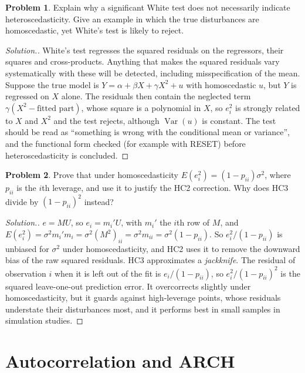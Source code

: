 \documentclass[11pt,a4paper]{article}
\numberwithin{equation}{section}
\DeclareMathOperator{\Var}{Var}
\theoremstyle{definition}
\newtheorem{problemx}{Problem}[subsection]
\newenvironment{problem}{\begin{problemx}}{\end{problemx}}
\newenvironment{solution}
  {\renewcommand{\qedsymbol}{}\begin{proof}[\textit{Solution}.]}
  {\end{proof}}
\begin{document}
\begin{problem}
Explain why a significant White test does not necessarily indicate heteroscedasticity. Give an example in which the true disturbances are homoscedastic,
yet White's test is likely to reject.
\end{problem}

\begin{solution}
White's test regresses the squared residuals on the regressors, their squares and cross-products. Anything that makes the squared residuals vary
systematically with these will be detected, including misspecification of the mean. Suppose the true model is $Y = \alpha + \beta X + \gamma X^2 + u$ with
homoscedastic $u$, but $Y$ is regressed on $X$ alone. The residuals then contain the neglected term $\gamma(X^2 - \text{fitted part})$, whose square is a
polynomial in $X$, so $e_i^2$ is strongly related to $X$ and $X^2$ and the test rejects, although $\Var(u)$ is constant. The test should be read as ``something is
wrong with the conditional mean or variance'', and the functional form checked (for example with RESET) before heteroscedasticity is concluded.
\end{solution}

\begin{problem}
Prove that under homoscedasticity $E(e_i^2) = (1 - p_{ii})\sigma^2$, where $p_{ii}$ is the $i$th leverage, and use it to justify the HC2 correction. Why does HC3 divide by
$(1 - p_{ii})^2$ instead?
\end{problem}

\begin{solution}
$e = MU$, so $e_i = m_i'U$, with $m_i'$ the $i$th row of $M$, and $E(e_i^2) = \sigma^2m_i'm_i = \sigma^2(M^2)_{ii} = \sigma^2m_{ii} = \sigma^2(1 - p_{ii})$. So $e_i^2/(1 - p_{ii})$ is unbiased for
$\sigma^2$ under homoscedasticity, and HC2 uses it to remove the downward bias of the raw squared residuals. HC3 approximates a \emph{jackknife}. The
residual of observation $i$ when it is left out of the fit is $e_i/(1 - p_{ii})$, so $e_i^2/(1 - p_{ii})^2$ is the squared leave-one-out prediction error. It overcorrects
slightly under homoscedasticity, but it guards against high-leverage points, whose residuals understate their disturbances most, and it performs best in
small samples in simulation studies.
\end{solution}

\section{Autocorrelation and ARCH}
\label{sec:autocorr}
\end{document}
